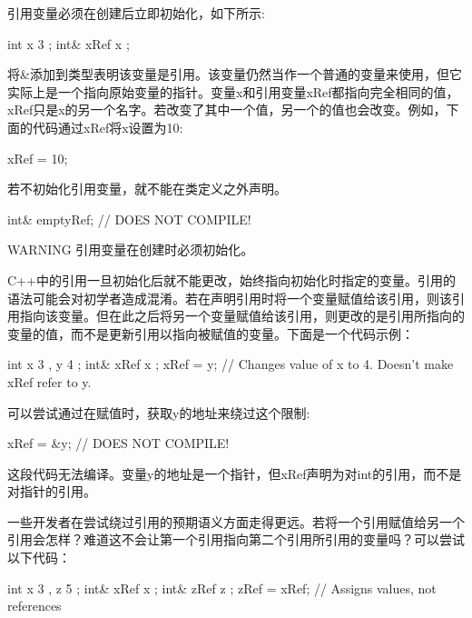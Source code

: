 引用变量必须在创建后立即初始化，如下所示:

\begin{cpp}
int x { 3 };
int& xRef { x };
\end{cpp}

将\&添加到类型表明该变量是引用。该变量仍然当作一个普通的变量来使用，但它实际上是一个指向原始变量的指针。变量x和引用变量xRef都指向完全相同的值，xRef只是x的另一个名字。若改变了其中一个值，另一个的值也会改变。例如，下面的代码通过xRef将x设置为10:

\begin{cpp}
xRef = 10;
\end{cpp}

若不初始化引用变量，就不能在类定义之外声明。

\begin{cpp}
int& emptyRef; // DOES NOT COMPILE!
\end{cpp}

\begin{myWarning}{WARNING}
引用变量在创建时必须初始化。
\end{myWarning}


C++中的引用一旦初始化后就不能更改，始终指向初始化时指定的变量。引用的语法可能会对初学者造成混淆。若在声明引用时将一个变量赋值给该引用，则该引用指向该变量。但在此之后将另一个变量赋值给该引用，则更改的是引用所指向的变量的值，而不是更新引用以指向被赋值的变量。下面是一个代码示例：

\begin{cpp}
int x { 3 }, y { 4 };
int& xRef { x };
xRef = y; // Changes value of x to 4. Doesn't make xRef refer to y.
\end{cpp}

可以尝试通过在赋值时，获取y的地址来绕过这个限制:

\begin{cpp}
xRef = &y; // DOES NOT COMPILE!
\end{cpp}

这段代码无法编译。变量y的地址是一个指针，但xRef声明为对int的引用，而不是对指针的引用。

一些开发者在尝试绕过引用的预期语义方面走得更远。若将一个引用赋值给另一个引用会怎样？难道这不会让第一个引用指向第二个引用所引用的变量吗？可以尝试以下代码：

\begin{cpp}
int x { 3 }, z { 5 };
int& xRef { x };
int& zRef { z };
zRef = xRef; // Assigns values, not references
\end{cpp}

